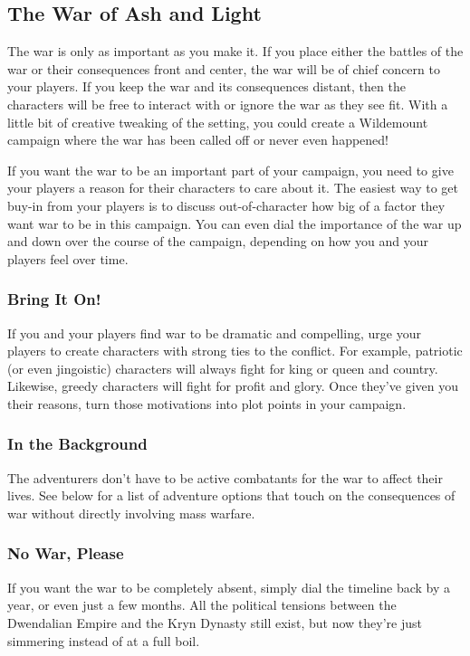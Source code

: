 \documentclass[10pt,a4paper,twoside,bg=print,twocolumn,openany,nodeprecatedcode]{dndbook}
\begin{document}
\subsection{The War of Ash and Light}
The war is only as important as you make it. If you place either the battles of the war or their consequences front and center, the war will be of chief concern to your players. If you keep the war and its consequences distant, then the characters will be free to interact with or ignore the war as they see fit. With a little bit of creative tweaking of the setting, you could create a Wildemount campaign where the war has been called off or never even happened!

If you want the war to be an important part of your campaign, you need to give your players a reason for their characters to care about it. The easiest way to get buy-in from your players is to discuss out-of-character how big of a factor they want war to be in this campaign. You can even dial the importance of the war up and down over the course of the campaign, depending on how you and your players feel over time.

\subsubsection{Bring It On!}
If you and your players find war to be dramatic and compelling, urge your players to create characters with strong ties to the conflict. For example, patriotic (or even jingoistic) characters will always fight for king or queen and country. Likewise, greedy characters will fight for profit and glory. Once they've given you their reasons, turn those motivations into plot points in your campaign.

\subsubsection{In the Background}
The adventurers don't have to be active combatants for the war to affect their lives. See below for a list of adventure options that touch on the consequences of war without directly involving mass warfare.

\subsubsection{No War, Please}
If you want the war to be completely absent, simply dial the timeline back by a year, or even just a few months. All the political tensions between the Dwendalian Empire and the Kryn Dynasty still exist, but now they're just simmering instead of at a full boil.
\end{document}
